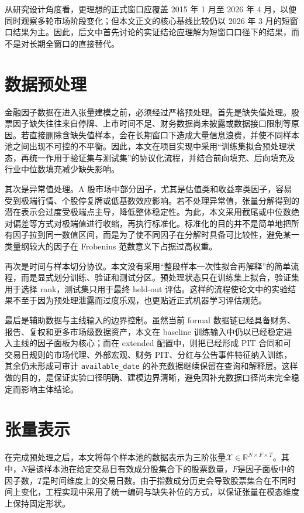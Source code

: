 从研究设计角度看，更理想的正式窗口应覆盖 2015 年 1 月至 2026 年 4 月，以便同时观察多轮市场阶段变化；但本文正文的核心基线比较仍以 2026 年 3 月的短窗口结果为主。因此，后文中首先讨论的实证结论应理解为短窗口口径下的结果，而不是对长期全窗口的直接替代。

\section{数据预处理}

金融因子数据在进入张量建模之前，必须经过严格预处理。首先是缺失值处理。股票因子缺失往往来自停牌、上市时间不足、财务数据尚未披露或数据接口限制等原因。若直接删除含缺失值样本，会在长期窗口下造成大量信息浪费，并使不同样本池之间出现不可控的不平衡。因此，本文在项目实现中采用“训练集拟合预处理状态，再统一作用于验证集与测试集”的协议化流程，并结合前向填充、后向填充及行业中位数填充减少缺失影响。

其次是异常值处理。A 股市场中部分因子，尤其是估值类和收益率类因子，容易受到极端行情、个股停复牌或低基数效应影响。若不处理异常值，张量分解得到的潜在表示会过度受极端点主导，降低整体稳定性。为此，本文采用截尾或中位数绝对偏差等方式对极端值进行收缩，再执行标准化。标准化的目的并不是简单地把所有因子拉到同一数值区间，而是为了使不同因子在分解时具备可比较性，避免某一类量纲较大的因子在 Frobenius 范数意义下占据过高权重。

再次是时间与样本切分协议。本文没有采用“整段样本一次性拟合再解释”的简单流程，而是显式划分训练、验证和测试分区。预处理状态只在训练集上拟合，验证集用于选择 rank，测试集只用于最终 held-out 评估。这样的流程使论文中的实验结果不至于因为预处理泄露而过度乐观，也更贴近正式机器学习评估规范。

最后是辅助数据与主线输入的边界控制。虽然当前 formal 数据链已经具备财务、报告、复权和更多市场级数据资产，本文在 baseline 训练输入中仍以已经稳定进入主线的因子面板为核心；而在 extended 配置中，则把已经形成 PIT 合同和可交易日规则的市场代理、外部宏观、财务 PIT、分红与公告事件特征纳入训练，其余仍未形成可审计 \texttt{available\_date} 的补充数据继续保留在查询和解释层。这样做的目的，是保证实验口径明确、建模边界清晰，避免因补充数据口径尚未完全稳定而影响主体结论。

\section{张量表示}

在完成预处理之后，本文将每个样本池的数据表示为三阶张量$\mathcal{X}\in\mathbb{R}^{N\times F\times T}$。其中，$N$是该样本池在给定交易日有效成分股集合下的股票数量，$F$是因子面板中的因子数，$T$是时间维度上的交易日数。由于指数成分历史会导致股票集合在不同时间上变化，工程实现中采用了统一编码与缺失补位的方式，以保证张量在模态维度上保持固定形状。

